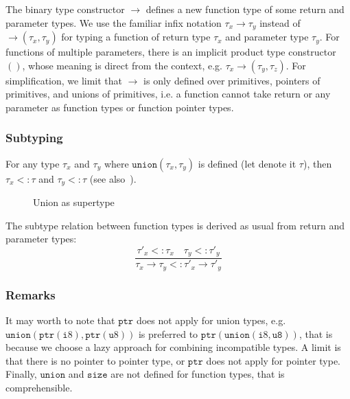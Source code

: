 \documentclass[compsoc,conference,a4paper,10pt,times]{IEEEtran}
\begin{document}
The binary type constructor $\to$ defines a new function type of some return and parameter types. 
We use the familiar infix notation $\tau_{x} \to \tau_{y}$ instead of $\to(\tau_{x}, \tau_{y})$ for
typing a function of return type $\tau_{x}$ and parameter type $\tau_{y}$.
For functions of multiple parameters, there is an implicit product type constructor $()$,
whose meaning is direct from the context,
e.g. $\tau_{x} \to (\tau_{y}, \tau_{z})$.
For simplification, we limit that $\to$ is only defined over primitives, pointers of primitives, and 
unions of primitives, i.e. a function cannot take return or any parameter as function types or 
function pointer types.

\subsubsection*{Subtyping}
For any type $\tau_{x}$ and $\tau_{y}$ where $\mathtt{union}(\tau_{x}, \tau_{y})$ is defined (let 
denote it $\tau$), then $\tau_{x} <\colon \tau$ and $\tau_{y} <\colon \tau$ (see also~).
\begin{figure}[h]
  \centering
  \caption{Union as supertype}
  \label{fig:unionsupertype}
\end{figure}
The subtype relation between function types is derived as usual from return and parameter types:
\begin{equation*}
  \frac{\tau'_{x} <\colon \tau_{x} \quad \tau_{y} <\colon \tau'_{y}}
       {\tau_{x} \to \tau_y <\colon \tau'_{x} \to \tau'_{y}}
\end{equation*}

\subsubsection*{Remarks}
It may worth to note that $\mathtt{ptr}$ does not apply for union types, e.g. 
$\mathtt{union}(\mathtt{ptr}(\mathtt{i}8), \mathtt{ptr}(\mathtt{u}8))$ is preferred to
$\mathtt{ptr}(\mathtt{union}(\mathtt{i}8, \mathtt{u8}))$, that is because we choose 
a lazy approach for combining incompatible types. A limit is that there is no 
pointer to pointer type, or $\mathtt{ptr}$ does not apply for pointer type. Finally,
$\mathtt{union}$ and $\mathtt{size}$ are not defined for function types, that is comprehensible.
\end{document}
